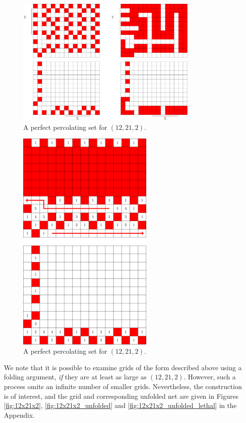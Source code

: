 \begin{figure}[]
\centering
\includegraphics[width=0.8\textwidth]{figures/7/12x15x2.pdf}
\caption{A perfect percolating set for $(12,21,2)$.}
\label{fig:12x15x2}
\end{figure} 

\begin{figure}[]
\centering
\includegraphics[width=0.6\textwidth]{figures/7/12x15x2_L1_numbered_heatmap.pdf}
\caption{A perfect percolating set for $(12,21,2)$.}
\label{fig:12x15x2_L1}
\end{figure} 

We note that it is possible to examine grids of the form described above using a folding argument, \emph{if} they are at least as large as $(12,21,2)$. However, such a process omits an infinite number of smaller grids. Nevertheless, the construction is of interest, and the grid and corresponding unfolded net are given in Figures \ref{fig:12x21x2}, \ref{fig:12x21x2_unfolded} and \ref{fig:12x21x2_unfolded_lethal} in the Appendix. 

